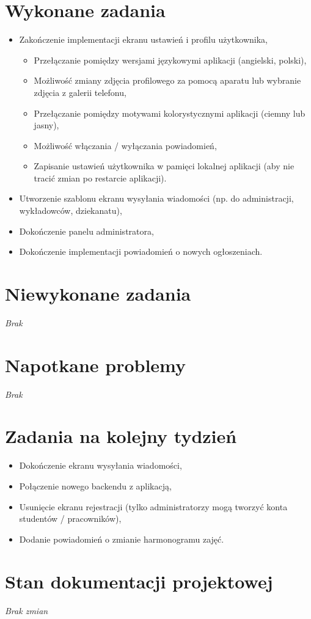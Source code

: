 \documentclass[12pt,a4paper]{mwart}
\begin{document}
\section{Wykonane zadania}
\begin{itemize}
	\item Zakończenie implementacji ekranu ustawień i profilu użytkownika,
	      \begin{itemize}
		      \item Przełączanie pomiędzy wersjami językowymi aplikacji (angielski, polski),
		      \item Możliwość zmiany zdjęcia profilowego za pomocą aparatu lub wybranie zdjęcia z galerii telefonu,
		      \item Przełączanie pomiędzy motywami kolorystycznymi aplikacji (ciemny lub jasny),
		      \item Możliwość włączania / wyłączania powiadomień,
		      \item Zapisanie ustawień użytkownika w pamięci lokalnej aplikacji (aby nie tracić zmian po restarcie aplikacji).
	      \end{itemize}
	\item Utworzenie szablonu ekranu wysyłania wiadomości (np. do administracji, wykładowców, dziekanatu),
	\item Dokończenie panelu administratora,
	\item Dokończenie implementacji powiadomień o nowych ogłoszeniach.
\end{itemize}

\section{Niewykonane zadania}
\textit{Brak}

\section{Napotkane problemy}
\textit{Brak}


\section{Zadania na kolejny tydzień}
\begin{itemize}
	\item Dokończenie ekranu wysyłania wiadomości,
	\item Połączenie nowego backendu z aplikacją,
	\item Usunięcie ekranu rejestracji (tylko administratorzy mogą tworzyć konta studentów / pracowników),
	\item Dodanie powiadomień o zmianie harmonogramu zajęć.
\end{itemize}

\section{Stan dokumentacji projektowej}
\textit{Brak zmian}
\end{document}
